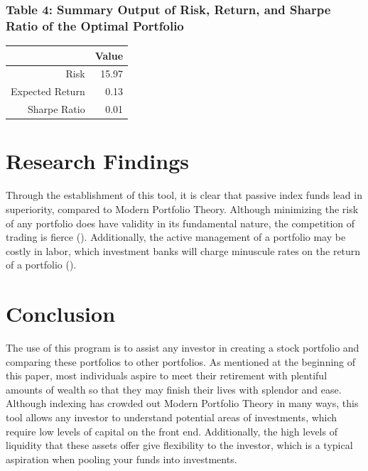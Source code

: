 \documentclass[12pt,english]{article}
\begin{document}
\begin{doublespace}
            \subsubsection{Table 4: Summary Output of Risk, Return, and Sharpe Ratio of the Optimal Portfolio}
                \begin{table}[ht]
                \centering
                \begin{tabular}{rr}
                  \hline
                 & Value \\ 
                  \hline
                Risk & 15.97 \\ 
                  Expected Return & 0.13 \\ 
                  Sharpe Ratio & 0.01 \\ 
                   \hline
                \end{tabular}
                \end{table}

    \section{Research Findings}\label{sec:results}\indent{}\indent{} %
    
        Through the establishment of this tool, it is clear that passive index funds lead in superiority, compared to Modern Portfolio Theory. Although minimizing the risk of any portfolio does have validity in its fundamental nature, the competition of trading is fierce (\citet{Zucker2020}). Additionally, the active management of a portfolio may be costly in labor, which investment banks will charge minuscule rates on the return of a portfolio (\citet{Zucker2020}).
    
    \section{Conclusion}\label{sec:conclusion}\indent{}\indent{} %
        The use of this program is to assist any investor in creating a stock portfolio and comparing these portfolios to other portfolios. As mentioned at the beginning of this paper, most individuals aspire to meet their retirement with plentiful amounts of wealth so that they may finish their lives with splendor and ease. Although indexing has crowded out Modern Portfolio Theory in many ways, this tool allows any investor to understand potential areas of investments, which require low levels of capital on the front end. Additionally, the high levels of liquidity that these assets offer give flexibility to the investor, which is a typical aspiration when pooling your funds into investments.
    
        \end{doublespace}
    
\end{document}
